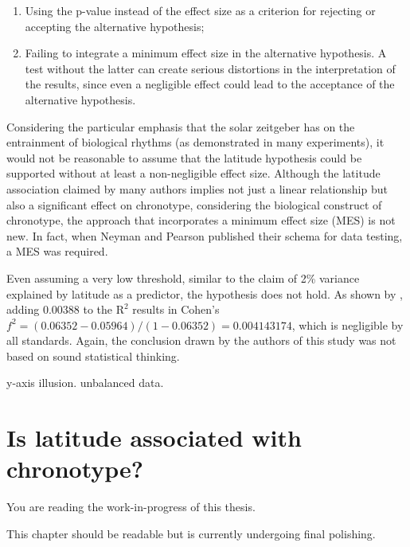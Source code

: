 \documentclass[
12pt,
openright,
oneside,
a4paper,
chapter=TITLE,
section=TITLE,
french,
spanish,
brazil,
english
]{abntex2}\usepackage{array}
\newcommand{\microskip}{\vspace{\microskipamount}}
\begin{document}
\begin{enumerate}
\def\labelenumi{\arabic{enumi}.}
\tightlist
\item
  Using the p-value instead of the effect size as a criterion for
  rejecting or accepting the alternative hypothesis;
\item
  Failing to integrate a minimum effect size in the alternative
  hypothesis. A test without the latter can create serious distortions
  in the interpretation of the results, since even a negligible effect
  could lead to the acceptance of the alternative hypothesis.
\end{enumerate}

Considering the particular emphasis that the solar zeitgeber has on the
entrainment of biological rhythms (as demonstrated in many experiments),
it would not be reasonable to assume that the latitude hypothesis could
be supported without at least a non-negligible effect size. Although the
latitude association claimed by many authors implies not just a linear
relationship but also a significant effect on chronotype, considering
the biological construct of chronotype, the approach that incorporates a
minimum effect size (MES) is not new. In fact, when Neyman and Pearson
published their schema for data testing, a MES was required.

Even assuming a very low threshold, similar to the claim of 2\% variance
explained by latitude as a predictor, the hypothesis does not hold. As
shown by \textcite{leocadio-miguel2017}, adding \(0.00388\) to the
\(\text{R}^2\) results in Cohen's
\(f^2 = (0.06352 - 0.05964) / (1 - 0.06352) = 0.004143174\), which is
negligible by all standards. Again, the conclusion drawn by the authors
of this study was not based on sound statistical thinking.

y-axis illusion. unbalanced data.


\chapter{Is latitude associated with
chronotype?}\label{is-latitude-associated-with-chronotype}

\begin{tcolorbox}[enhanced jigsaw, opacitybacktitle=0.6, titlerule=0mm, coltitle=black, bottomtitle=1mm, breakable, rightrule=.15mm, left=2mm, title=\textcolor{quarto-callout-note-color}{\faInfo}\hspace{0.5em}{Note}, opacityback=0, colbacktitle=quarto-callout-note-color!10!white, toprule=.15mm, toptitle=1mm, leftrule=.75mm, colback=white, bottomrule=.15mm, arc=.35mm, colframe=quarto-callout-note-color-frame]

You are reading the work-in-progress of this thesis.

\microskip

This chapter should be readable but is currently undergoing final
polishing.

\end{tcolorbox}
\end{document}
